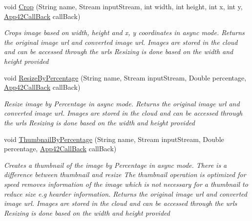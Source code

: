 \begin{DoxyCompactItemize}
void \hyperlink{classcom_1_1shephertz_1_1app42_1_1paas_1_1sdk_1_1csharp_1_1image_processor_1_1_image_processor_service_a7ffc05965a637a17ced4e93c5c9f7775}{Crop} (String name, Stream input\+Stream, int width, int height, int x, int y, \hyperlink{interfacecom_1_1shephertz_1_1app42_1_1paas_1_1sdk_1_1csharp_1_1_app42_call_back}{App42\+Call\+Back} call\+Back)
\begin{DoxyCompactList}\small\item\em Crops image based on width, height and x, y coordinates in async mode. Returns the original image url and converted image url. Images are stored in the cloud and can be accessed through the urls Resizing is done based on the width and height provided \end{DoxyCompactList}\item 
void \hyperlink{classcom_1_1shephertz_1_1app42_1_1paas_1_1sdk_1_1csharp_1_1image_processor_1_1_image_processor_service_a3fff94013287eb2934d90638dacd0760}{Resize\+By\+Percentage} (String name, Stream input\+Stream, Double percentage, \hyperlink{interfacecom_1_1shephertz_1_1app42_1_1paas_1_1sdk_1_1csharp_1_1_app42_call_back}{App42\+Call\+Back} call\+Back)
\begin{DoxyCompactList}\small\item\em Resize image by Percentage in async mode. Returns the original image url and converted image url. Images are stored in the cloud and can be accessed through the urls Resizing is done based on the width and height provided \end{DoxyCompactList}\item 
void \hyperlink{classcom_1_1shephertz_1_1app42_1_1paas_1_1sdk_1_1csharp_1_1image_processor_1_1_image_processor_service_a379afd6138c002e7b63d1856b71d7eba}{Thumbnail\+By\+Percentage} (String name, Stream input\+Stream, Double percentage, \hyperlink{interfacecom_1_1shephertz_1_1app42_1_1paas_1_1sdk_1_1csharp_1_1_app42_call_back}{App42\+Call\+Back} call\+Back)
\begin{DoxyCompactList}\small\item\em Creates a thumbnail of the image by Percentage in async mode. There is a difference between thumbnail and resize The thumbnail operation is optimized for speed removes information of the image which is not necessary for a thumbnail to reduce size e.\+g hearder information. Returns the original image url and converted image url. Images are stored in the cloud and can be accessed through the urls Resizing is done based on the width and height provided \end{DoxyCompactList}\item 

\end{DoxyCompactItemize}
